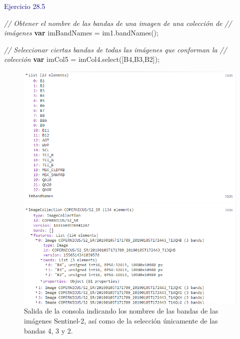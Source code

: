 \documentclass[
  12pt,
  letterpaper,
  twoside]{book}
\newenvironment{Shaded}{\begin{snugshade}}{\end{snugshade}}
\newcommand{\CommentTok}[1]{\textcolor[rgb]{0.24,0.58,0.00}{\textit{#1}}}
\newcommand{\FunctionTok}[1]{\textcolor[rgb]{0.48,0.12,0.64}{#1}}
\newcommand{\KeywordTok}[1]{\textcolor[rgb]{0.00,0.00,0.00}{\textbf{#1}}}
\newcommand{\NormalTok}[1]{#1}
\newcommand{\OperatorTok}[1]{\textcolor[rgb]{0.00,0.00,0.00}{#1}}
\newcommand{\StringTok}[1]{\textcolor[rgb]{0.87,0.29,0.22}{#1}}
\begin{document}
\textcolor{darkblue}{Ejercicio 28.5}

\begin{Shaded}
\begin{Highlighting}[]
\CommentTok{// Obtener el nombre de las bandas de una imagen de una colección de }
\CommentTok{// imágenes}
\KeywordTok{var}\NormalTok{ imBandNames }\OperatorTok{=}\NormalTok{ im1}\OperatorTok{.}\FunctionTok{bandNames}\NormalTok{()}\OperatorTok{;}

\CommentTok{// Seleccionar ciertas bandas de todas las imágenes que conforman la }
\CommentTok{// colección}
\KeywordTok{var}\NormalTok{ imCol5 }\OperatorTok{=}\NormalTok{ imCol4}\OperatorTok{.}\FunctionTok{select}\NormalTok{([}\StringTok{\textquotesingle{}B4\textquotesingle{}}\OperatorTok{,}\StringTok{\textquotesingle{}B3\textquotesingle{}}\OperatorTok{,}\StringTok{\textquotesingle{}B2\textquotesingle{}}\NormalTok{])}\OperatorTok{;}
\end{Highlighting}
\end{Shaded}

\begin{figure}[H]

{\centering \includegraphics[width=0.8\linewidth]{Img/imBandNames1} 

}

\caption{Salida de la consola indicando los nombres de las bandas de las imágenes Sentinel-2, así como de la selección únicamente de las bandas 4, 3 y 2.}\label{fig:f105}
\end{figure}
\end{document}

